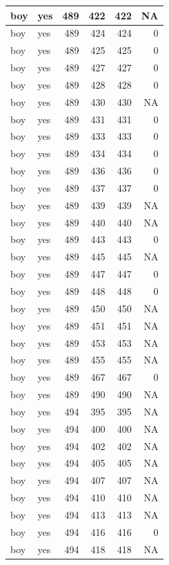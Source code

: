 \documentclass[man]{apa6}
\begin{document}
\begin{tabular}{l|l|r|r|r|r}
\hline
boy & yes & 489 & 422 & 422 & NA\\
\hline
boy & yes & 489 & 424 & 424 & 0\\
\hline
boy & yes & 489 & 425 & 425 & 0\\
\hline
boy & yes & 489 & 427 & 427 & 0\\
\hline
boy & yes & 489 & 428 & 428 & 0\\
\hline
boy & yes & 489 & 430 & 430 & NA\\
\hline
boy & yes & 489 & 431 & 431 & 0\\
\hline
boy & yes & 489 & 433 & 433 & 0\\
\hline
boy & yes & 489 & 434 & 434 & 0\\
\hline
boy & yes & 489 & 436 & 436 & 0\\
\hline
boy & yes & 489 & 437 & 437 & 0\\
\hline
boy & yes & 489 & 439 & 439 & NA\\
\hline
boy & yes & 489 & 440 & 440 & NA\\
\hline
boy & yes & 489 & 443 & 443 & 0\\
\hline
boy & yes & 489 & 445 & 445 & NA\\
\hline
boy & yes & 489 & 447 & 447 & 0\\
\hline
boy & yes & 489 & 448 & 448 & 0\\
\hline
boy & yes & 489 & 450 & 450 & NA\\
\hline
boy & yes & 489 & 451 & 451 & NA\\
\hline
boy & yes & 489 & 453 & 453 & NA\\
\hline
boy & yes & 489 & 455 & 455 & NA\\
\hline
boy & yes & 489 & 467 & 467 & 0\\
\hline
boy & yes & 489 & 490 & 490 & NA\\
\hline
boy & yes & 494 & 395 & 395 & NA\\
\hline
boy & yes & 494 & 400 & 400 & NA\\
\hline
boy & yes & 494 & 402 & 402 & NA\\
\hline
boy & yes & 494 & 405 & 405 & NA\\
\hline
boy & yes & 494 & 407 & 407 & NA\\
\hline
boy & yes & 494 & 410 & 410 & NA\\
\hline
boy & yes & 494 & 413 & 413 & NA\\
\hline
boy & yes & 494 & 416 & 416 & 0\\
\hline
boy & yes & 494 & 418 & 418 & NA\\

\end{tabular}
\end{document}
